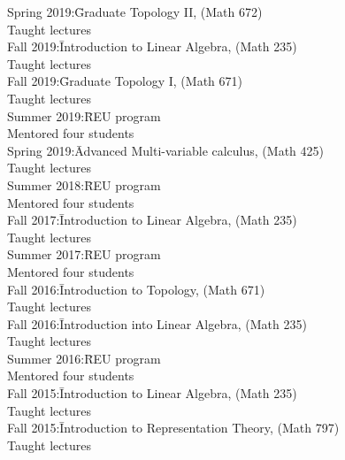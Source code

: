 \documentclass[11pt]{amsart}
\theoremstyle{plain}
\theoremstyle{definition}
\theoremstyle{remark}
\begin{document}
\begin{tabbing}
  
Spring 2019:\quad\quad\= Graduate Topology II, (Math 672)\\
\>Taught lectures \\

  
Fall 2019:\quad\quad\quad\= Introduction to Linear Algebra, (Math 235)\\
\>Taught lectures \\

  
Fall 2019:\quad\quad\quad\= Graduate Topology I, (Math 671)\\
\>Taught lectures \\


Summer 2019:\quad\= REU program\\
\>Mentored four students \\
  
  
Spring 2019:\quad\quad\= Advanced Multi-variable calculus, (Math 425)\\
\>Taught lectures \\


Summer 2018:\quad\= REU program\\
\>Mentored four students \\

  
Fall 2017:\quad\quad\quad\= Introduction to Linear Algebra, (Math 235)\\
\>Taught lectures \\


Summer 2017:\quad\= REU program\\
\>Mentored four students \\



  
Fall 2016:\quad\quad\quad\= Introduction to Topology, (Math 671)\\
\>Taught lectures \\


Fall 2016:\quad\quad\quad\= Introduction into Linear Algebra, (Math 235)\\
\>Taught lectures \\

Summer 2016:\quad\= REU program\\
\>Mentored four students \\

Fall 2015:\quad\quad\quad\= Introduction to Linear Algebra, (Math 235)\\
\>Taught lectures \\


Fall 2015:\quad\quad\quad\= Introduction to Representation Theory, (Math 797)\\
\>Taught lectures \\


\end{tabbing}
\end{document}
